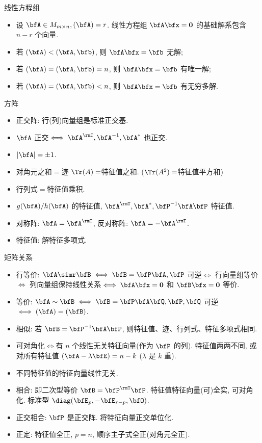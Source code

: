 \documentclass[aspectratio=169,handout]{ctexbeamer}
\let\rank\relax\DeclareMathOperator\rank{\rank}
\begin{document}
\begin{frame}{线性方程组}
	\onslide<+->
	\begin{itemize}
		\item 设 $\bfA\in M_{m\times n}, \rank(\bfA)=r$.
		线性方程组 $\bfA\bfx={\bf0}$ 的基础解系包含 $n-r$ 个向量.
		\item 若 $\rank(\bfA)<\rank(\bfA,\bfb)$, 则 $\bfA \bfx=\bfb$ 无解;
		\item 若 $\rank(\bfA)=\rank(\bfA,\bfb)=n$, 则 $\bfA \bfx=\bfb$ 有唯一解;
		\item 若 $\rank(\bfA)=\rank(\bfA,\bfb)<n$, 则 $\bfA \bfx=\bfb$ 有无穷多解.
	\end{itemize}
\end{frame}


\begin{frame}{方阵}
	\onslide<+->
	\begin{itemize}
		\item 正交阵: 行(列)向量组是标准正交基.
		\item $\bfA$ 正交$\iff\bfA^\rmT,\bfA^{-1},\bfA^*$ 也正交.
		\item $|\bfA|=\pm1$.
		\item 对角元之和$=$迹 $\Tr(A)=$特征值之和. ($\Tr(A^2)=$特征值平方和)
		\item 行列式$=$特征值乘积.
		\item $g(\bfA)/h(\bfA)$ 的特征值, $\bfA^\rmT,\bfA^*,\bfP^{-1}\bfA\bfP$ 特征值.
		\item 对称阵: $\bfA=\bfA^\rmT$, 反对称阵: $\bfA=-\bfA^\rmT$.
		\item 特征值: 解特征多项式.
	\end{itemize}
\end{frame}



\begin{frame}{矩阵关系}
	\onslide<+->
	\begin{itemize}
		\item 行等价: $\bfA\simr\bfB\iff \bfB=\bfP\bfA,\bfP$ 可逆$\iff$ 行向量组等价$\iff$ 列向量组保持线性关系$\iff\bfA\bfx={\bf0}$ 和 $\bfB\bfx={\bf0}$ 等价.
		\item 等价: $\bfA\sim\bfB\iff \bfB=\bfP\bfA\bfQ,\bfP,\bfQ$ 可逆$\iff \rank(\bfA)=\rank(\bfB)$.
		\item 相似: 若 $\bfB=\bfP^{-1}\bfA\bfP$, 则特征值、迹、行列式、特征多项式相同.
		\item 可对角化$\iff$有 $n$ 个线性无关特征向量(作为 $\bfP$ 的列). 特征值两两不同, 或对所有特征值 $\rank(\bfA-\lambda\bfE)=n-k$ ($\lambda$ 是 $k$ 重).
		\item 不同特征值的特征向量线性无关.
		\item 相合: 即二次型等价 $\bfB=\bfP^\rmT\bfP$. 特征值特征向量(可)全实, 可对角化. 标准型 $\diag(\bfE_p,-\bfE_{r-p},\bfO)$.
		\item 正交相合: $\bfP$ 是正交阵. 将特征向量正交单位化.
		\item 正定: 特征值全正, $p=n$, 顺序主子式全正(对角元全正).
	\end{itemize}
\end{frame}
\end{document}
